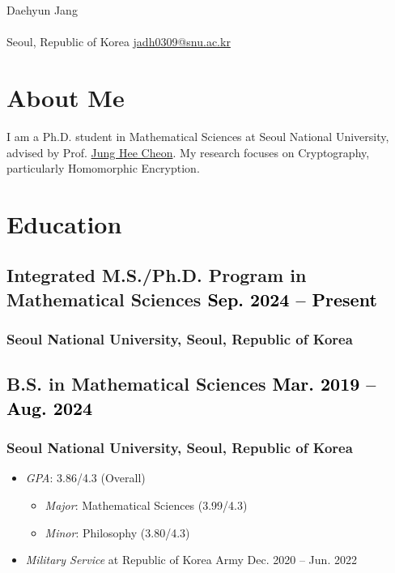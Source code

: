 \documentclass[11pt]{article}
\begin{document}
\begin{center}
{\fontsize{28}{28}\selectfont Daehyun Jang} \\ \bigskip
\vspace{-1cm}{\hfill \small CV Ver:\\\hfill\mydate\today} \\
{\color{blue2}\faMapMarker} Seoul, Republic of Korea \quad
{\color{blue2}\faEnvelope[regular]} \href{mailto:jadh0309@snu.ac.kr}{jadh0309@snu.ac.kr}
\end{center}

\section{About Me}
I am a Ph.D. student in Mathematical Sciences at Seoul National University, advised by Prof. \href{https://web.math.snu.ac.kr/~jhcheon/}{Jung Hee Cheon}.
My research focuses on Cryptography, particularly Homomorphic Encryption.

\section{Education}

        \subsection{Integrated M.S./Ph.D. Program in Mathematical Sciences \hfill \textcolor{black}{\normalfont Sep. 2024 -- Present}}
                \subsubsection{Seoul National University, Seoul, Republic of Korea}

        \subsection{B.S. in Mathematical Sciences \hfill \textcolor{black}{\normalfont Mar. 2019 -- Aug. 2024}}
            \subsubsection{Seoul National University, Seoul, Republic of Korea}
            \begin{itemize}
                \item \textit{GPA}: 3.86/4.3 (Overall)
                    \begin{itemize}
                        \item \textit{Major}: Mathematical Sciences (3.99/4.3)
                        \item \textit{Minor}: Philosophy (3.80/4.3)
                    \end{itemize}
                \item {\small \textit{Military Service} at Republic of Korea Army \hfill \normalfont Dec. 2020 -- Jun. 2022}
            \end{itemize}
\end{document}
